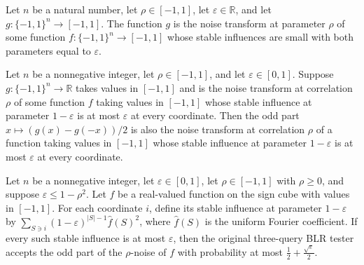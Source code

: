 \begin{definition}
\label{FABL.IsNoiseOfSmallStableInfluences}
\leanok
{}
Let $n$ be a natural number, let $\rho\in[-1,1]$, let $\varepsilon\in\mathbb R$, and let
$g:\{-1,1\}^n\to[-1,1]$. The function $g$ is the noise transform at parameter $\rho$ of
some function $f:\{-1,1\}^n\to[-1,1]$ whose stable influences are small with both
parameters equal to $\varepsilon$.
\end{definition}

\begin{theorem}
\label{FABL.IsNoiseOfSmallStableInfluences.oddPart}
\leanok
{}
Let $n$ be a nonnegative integer, let $\rho\in[-1,1]$, and let
$\varepsilon\in[0,1]$. Suppose $g:\{-1,1\}^n\to\mathbb R$ takes values in $[-1,1]$
and is the noise transform at correlation $\rho$ of some function $f$ taking values in
$[-1,1]$ whose stable influence at parameter $1-\varepsilon$ is at most $\varepsilon$
at every coordinate. Then the odd part $x\mapsto(g(x)-g(-x))/2$ is also the noise
transform at correlation $\rho$ of a function taking values in $[-1,1]$ whose stable
influence at parameter $1-\varepsilon$ is at most $\varepsilon$ at every coordinate.
\end{theorem}

\begin{theorem}
\label{FABL.originalBLRTester_acceptanceProbability_odd_noise_le}
\leanok
{}
Let $n$ be a nonnegative integer, let $\varepsilon\in[0,1]$, let $\rho\in[-1,1]$
with $\rho\ge 0$, and suppose $\varepsilon\le 1-\rho^2$. Let $f$ be a real-valued
function on the sign cube with values in $[-1,1]$. For each coordinate $i$, define its
stable influence at parameter $1-\varepsilon$ by $\sum_{S\ni
i}(1-\varepsilon)^{|S|-1}\widehat f(S)^2$, where $\widehat f(S)$ is the uniform
Fourier coefficient. If every such stable influence is at most $\varepsilon$, then the
original three-query BLR tester accepts the odd part of the $\rho$-noise of $f$ with
probability at most $\frac12+\frac{\sqrt{\varepsilon}}2$.
\end{theorem}

